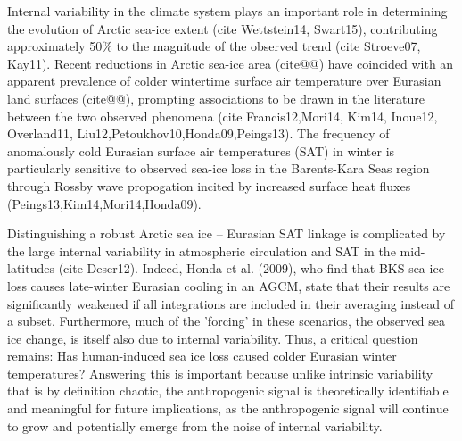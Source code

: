 \documentclass[grl]{AGUTeX}  %
\begin{document}
\begin{article}

%
%



Internal variability in the climate system plays an important role in determining the evolution of Arctic sea-ice extent (cite Wettstein14, Swart15), contributing approximately 50\% to the magnitude of the observed trend (cite Stroeve07, Kay11). Recent reductions in Arctic sea-ice area (cite@@) have coincided with an apparent prevalence of colder wintertime surface air temperature over Eurasian land surfaces (cite@@), prompting associations to be drawn in the literature between the two observed phenomena (cite Francis12,Mori14, Kim14, Inoue12, Overland11, Liu12,Petoukhov10,Honda09,Peings13). The frequency of anomalously cold Eurasian surface air temperatures (SAT) in winter is particularly sensitive to observed sea-ice loss in the Barents-Kara Seas region through Rossby wave propogation incited by increased surface heat fluxes (Peings13,Kim14,Mori14,Honda09). %

Distinguishing a robust Arctic sea ice -- Eurasian SAT linkage is complicated by the large internal variability in atmospheric circulation and SAT in the mid-latitudes (cite Deser12). Indeed, Honda et al. (2009), who find that BKS sea-ice loss causes late-winter Eurasian cooling in an AGCM, state that their results are significantly weakened if all integrations are included in their averaging instead of a subset. Furthermore, much of the 'forcing' in these scenarios, the observed sea ice change, is itself also due to internal variability. Thus, a critical question remains: Has human-induced sea ice loss caused colder Eurasian winter temperatures? Answering this is important because unlike intrinsic variability that is by definition chaotic, the anthropogenic signal is theoretically identifiable and meaningful for future implications, as the anthropogenic signal will continue to grow and potentially emerge from the noise of internal variability.


\end{article}
\end{document}
